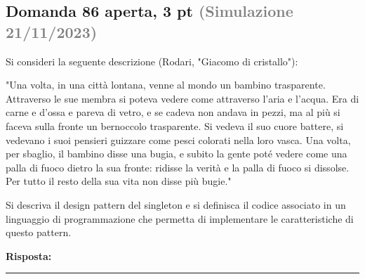 \documentclass[a4paper,11pt]{article}
\begin{document}
\subsection*{Domanda 86 \hfill {\small aperta, 3 pt \textcolor{gray}{(Simulazione 21/11/2023)}}}
\begin{tcolorbox}[colback=gray!8,colframe=gray!50,title=Contesto]
Si consideri la seguente descrizione (Rodari, "Giacomo di cristallo"):

"Una volta, in una città lontana, venne al mondo un bambino trasparente. Attraverso le sue membra si poteva vedere come attraverso l'aria e l'acqua. Era di carne e d'ossa e pareva di vetro, e se cadeva non andava in pezzi, ma al più si faceva sulla fronte un bernoccolo trasparente. Si vedeva il suo cuore battere, si vedevano i suoi pensieri guizzare come pesci colorati nella loro vasca. Una volta, per sbaglio, il bambino disse una bugia, e subito la gente poté vedere come una palla di fuoco dietro la sua fronte: ridisse la verità e la palla di fuoco si dissolse. Per tutto il resto della sua vita non disse più bugie."
\end{tcolorbox}
Si descriva il design pattern del singleton e si definisca il codice associato in un linguaggio di programmazione che permetta di implementare le caratteristiche di questo pattern.

\vspace{0.2cm}
\noindent\textbf{Risposta:}\par
\vspace{4cm}\hrule


\end{document}
